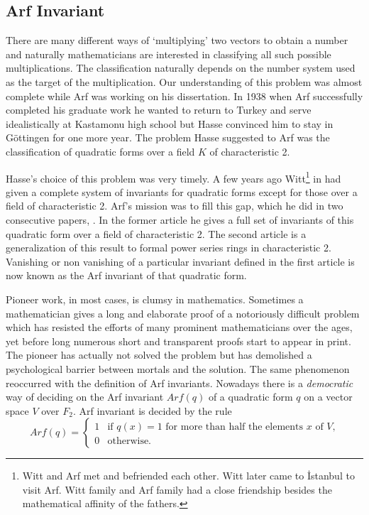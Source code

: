 \documentclass[12pt]{amsart}
\begin{document}
\subsection{Arf Invariant}
There are many different ways of `multiplying' two vectors to obtain a number and naturally mathematicians are interested in classifying all such possible multiplications. The classification naturally depends on the number system used as the target of the multiplication. Our understanding of this problem was almost complete while Arf was working on his dissertation. In 1938 when Arf successfully completed his graduate work he wanted to return to Turkey and serve idealistically at Kastamonu high school but Hasse convinced him to stay in G\"{o}ttingen for one more year. The problem Hasse suggested to Arf was the classification of quadratic forms over a field $K$ of characteristic 2.

Hasse's choice of this problem was very timely. A few years ago Witt\footnote{Witt and Arf  met and befriended each other. Witt later came to  {\.I}stanbul  to visit Arf. Witt family and Arf family had a close friendship besides the mathematical affinity of the fathers.} in \cite{witt} had given a complete system of invariants for quadratic forms except for those over a field of characteristic 2. Arf's mission was to fill this gap, which he did  in two consecutive papers, \cite{carf1,carf2}. In the former article he gives a full set of invariants of this quadratic form over a field of characteristic 2. The second article is a generalization of this result to formal power series rings in characteristic 2. Vanishing or non vanishing of a particular invariant defined in the first article is now known as the Arf invariant of that quadratic form.

Pioneer work, in most cases, is clumsy in mathematics. Sometimes a mathematician gives a long and elaborate proof of a notoriously difficult problem which has resisted the efforts of many prominent mathematicians over the ages, yet before long numerous short and transparent proofs start to appear in print. The pioneer has actually not solved the problem but has demolished a psychological barrier between mortals and the solution. The same phenomenon reoccurred with the definition of Arf invariants. Nowadays there is a {\it democratic} way of deciding on the Arf invariant $Arf(q)$ of a quadratic form $q$ on a vector space $V$ over $F_2$. Arf invariant is decided by the rule
\[ Arf(q)=\left\{ \begin{array}{ll}
1 & \mbox{if~} q(x)=1 \mbox{~for more than half the elements $x$ of $V$,} \\
0 & \mbox{otherwise.}
\end{array} \right. \]
\end{document}
